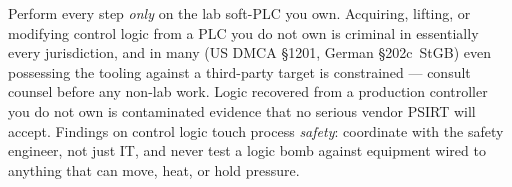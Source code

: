 \documentclass[11pt,a4paper]{article}
\begin{document}
\begin{warnbox}
Perform every step \emph{only} on the lab soft-PLC you own. Acquiring,
lifting, or modifying control logic from a PLC you do not own is criminal
in essentially every jurisdiction, and in many (US DMCA \S1201, German
\S202c~StGB) even possessing the tooling against a third-party target is
constrained --- consult counsel before any non-lab work. Logic recovered
from a production controller you do not own is contaminated evidence that
no serious vendor PSIRT will accept. Findings on control logic touch
process \emph{safety}: coordinate with the safety engineer, not just IT,
and never test a logic bomb against equipment wired to anything that can
move, heat, or hold pressure.
\end{warnbox}
\end{document}
